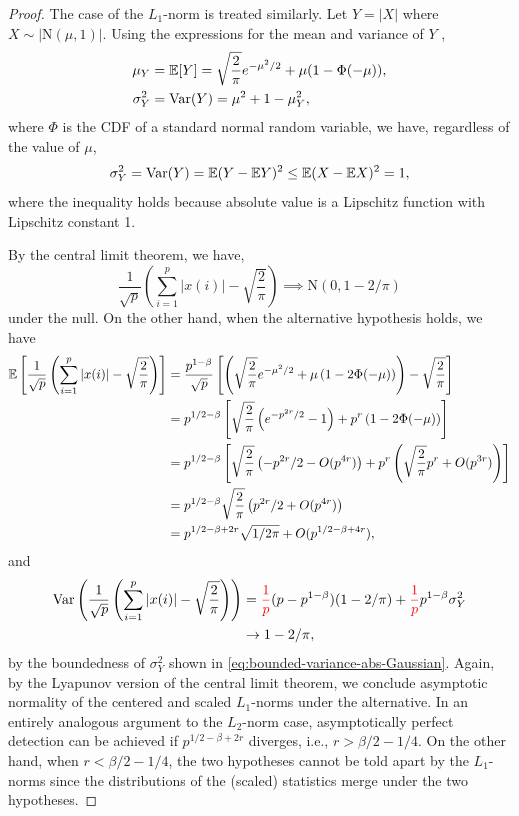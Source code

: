 \begin{proof}
The case of the $L_1$-norm is treated similarly.
Let $Y=|X|$ where $X\sim|\mathrm{N}(\mu,1)|$. 
Using the expressions for the mean and variance of $Y$ \citep[see, e.g.,][]{tsagris2014folded},
\begin{align}
    \mu_Y &= {\mathbb E}[Y] = \sqrt{\frac{2}{\pi}}e^{-\mu^2/2} + \mu(1-\Phi(-\mu)), \\
    \sigma_Y^2 &= \mathrm{Var}(Y) = \mu^2 + 1 - \mu^2_Y,
\end{align}
where $\Phi$ is the CDF of a standard normal random variable,
we have, regardless of the value of $\mu$,
\begin{equation} \label{eq:bounded-variance-abs-Gaussian}
    \sigma_Y^2 = \mathrm{Var}(Y) = {\mathbb E}(Y-{\mathbb E} Y)^2 \le {\mathbb E}(X-{\mathbb E} X)^2 = 1,
\end{equation}
where the inequality holds because absolute value is a Lipschitz function with Lipschitz constant 1.

By the central limit theorem, we have,
\begin{equation}
    \frac{1}{\sqrt{p}}\left(\sum_{i=1}^p |x(i)| - \sqrt{\frac{2}{\pi}}\right) \implies \mathrm{N}(0, 1-2/\pi)
\end{equation}
under the null.
On the other hand, when the alternative hypothesis holds, we have
\begin{align*}
    {\mathbb E} \left[ \frac{1}{\sqrt{p}} \left(\sum_{i=1}^p |x(i)| - \sqrt{\frac{2}{\pi}}\right) \right] 
    &= \frac{p^{1-\beta}}{\sqrt{p}}\left[\left(\sqrt{\frac{2}{\pi}}e^{-\mu^2/2} + \mu\left(1-2\Phi(-\mu)\right) \right) - \sqrt{\frac{2}{\pi}} \right] \\
    &= p^{1/2-\beta} \left[\sqrt{\frac{2}{\pi}}\left(e^{-p^{2r}/2} - 1 \right) + p^r\left(1-2\Phi(-\mu)\right) \right] \\
    &= p^{1/2-\beta} \left[\sqrt{\frac{2}{\pi}}\left(-p^{2r}/2 - O(p^{4r})\right) + p^r\left(\sqrt{\frac{2}{\pi}}p^r + O(p^{3r})\right) \right] \\
    &= p^{1/2-\beta} \sqrt{\frac{2}{\pi}} \left(p^{2r}/2 + O(p^{4r}) \right) \\
    &= p^{1/2-\beta+2r} \sqrt{{1}/{2\pi}} + O(p^{1/2-\beta+4r}),
\end{align*}
and 
\begin{align*}
    \mathrm{Var} \left(\frac{1}{\sqrt{p}} \left(\sum_{i=1}^p |x(i)| - \sqrt{\frac{2}{\pi}}\right) \right) 
    & = {\color{red}\frac{1}{p}}  (p-p^{1-\beta})(1-2/\pi) + {\color{red}\frac{1}{p}}   p^{1-\beta}\sigma_{Y}^2 \\
    & \to 1-2/\pi,
\end{align*}
by the boundedness of $\sigma_{Y}^2$ shown in \eqref{eq:bounded-variance-abs-Gaussian}.
Again, by the Lyapunov version of the central limit theorem, we conclude asymptotic normality of the centered and scaled $L_1$-norms under the alternative.
In an entirely analogous argument to the $L_2$-norm case, asymptotically perfect detection can be achieved if $p^{1/2-\beta+2r}$ diverges, i.e., $r>\beta/2-1/4$.
On the other hand, when $r<\beta/2-1/4$, the two hypotheses cannot be told apart by the $L_1$-norms since the distributions of the (scaled) statistics merge under the two hypotheses.
\end{proof}





